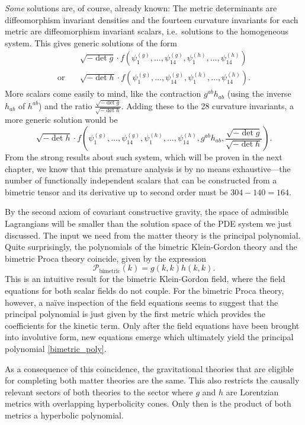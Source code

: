 \emph{Some} solutions are, of course, already known: The metric determinants are diffeomorphism invariant densities and the fourteen curvature invariants for each metric are diffeomorphism invariant scalars, i.e.~solutions to the homogeneous system. This gives generic solutions of the form
\begin{equation}
  \begin{aligned}
  {}& \sqrt{-\operatorname{det}g}\cdot f(\psi^{(g)}_1,\dots,\psi^{(g)}_{14},\psi^{(h)}_1,\dots,\psi^{(h)}_{14}) \\
    \text{or}\quad{}& \sqrt{-\operatorname{det}h}\cdot f(\psi^{(g)}_1,\dots,\psi^{(g)}_{14},\psi^{(h)}_1,\dots,\psi^{(h)}_{14}).
  \end{aligned}
\end{equation}
More scalars come easily to mind, like the contraction $g^{ab} h_{ab}$ (using the inverse $h_{ab}$ of $h^{ab}$) and the ratio $\frac{\sqrt{-\operatorname{det}g}}{\sqrt{-\operatorname{det}h}}$. Adding these to the 28 curvature invariants, a more generic solution would be
\begin{equation}
  \sqrt{-\operatorname{det}h}\cdot f(\psi^{(g)}_1,\dots,\psi^{(g)}_{14},\psi^{(h)}_1,\dots,\psi^{(h)}_{14},g^{ab}h_{ab}, \frac{\sqrt{-\operatorname{det}g}}{\sqrt{-\operatorname{det}h}}).
\end{equation}
From the strong results about such system, which will be proven in the next chapter, we know that this premature analysis is by no means exhaustive---the number of functionally independent scalars that can be constructed from a bimetric tensor and its derivative up to second order must be $304-140=164$.

By the second axiom of covariant constructive gravity, the space of admissible Lagrangians will be smaller than the solution space of the PDE system we just discussed. The input we need from the matter theory is the principal polynomial. Quite surprisingly, the polynomials of the bimetric Klein-Gordon theory and the bimetric Proca theory coincide, given by the expression
\begin{equation}\label{bimetric_poly}
  \mathcal P_\text{bimetric}(k) = g(k,k) h(k,k).
\end{equation}
This is an intuitive result for the bimetric Klein-Gordon field, where the field equations for both scalar fields do not couple. For the bimetric Proca theory, however, a na\"ive inspection of the field equations seems to suggest that the principal polynomial is just given by the first metric which provides the coefficients for the kinetic term. Only after the field equations have been brought into involutive form, new equations emerge which ultimately yield the principal polynomial \eqref{bimetric_poly}.\cite{wierzba}

As a consequence of this coincidence, the gravitational theories that are eligible for completing both matter theories are the same. This also restricts the causally relevant sectors of both theories to the sector where $g$ and $h$ are Lorentzian metrics with overlapping hyperbolicity cones. Only then is the product of both metrics a hyperbolic polynomial.

